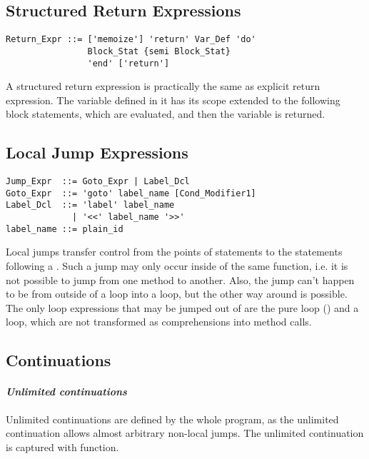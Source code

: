\subsection{Structured Return Expressions}

\syntax\begin{lstlisting}
Return_Expr ::= ['memoize'] 'return' Var_Def 'do' 
                Block_Stat {semi Block_Stat} 
                'end' ['return']
\end{lstlisting}

A structured return expression is practically the same as explicit return expression. The variable defined in it has its scope extended to the following block statements, which are evaluated, and then the variable is returned. 






\subsection{Local Jump Expressions}
\label{sec:local-jump-expressions}

\syntax\begin{lstlisting}
Jump_Expr  ::= Goto_Expr | Label_Dcl
Goto_Expr  ::= 'goto' label_name [Cond_Modifier1]
Label_Dcl  ::= 'label' label_name 
             | '<<' label_name '>>'
label_name ::= plain_id
\end{lstlisting}

Local jumps transfer control from the points of  statements to the statements following a . Such a jump may only occur inside of the same function, i.e. it is not possible to jump from one method to another. Also, the jump can't happen to be from outside of a loop into a loop, but the other way around is possible. The only loop expressions that may be jumped out of are the pure loop () and a  loop, which are not transformed as comprehensions into method calls. 






\subsection{Continuations}

\paragraph{\em Unlimited continuations}
Unlimited continuations are defined by the whole program, as the unlimited continuation allows almost arbitrary non-local jumps. The unlimited continuation is captured with  function. 

